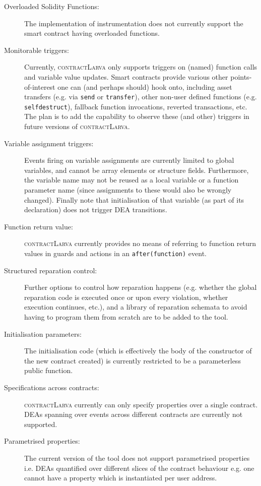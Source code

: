 \documentclass{article}
\newcommand{\contractlarva}{\textsc{contractLarva}\xspace}
\begin{document}
  \begin{description}
    \item[Overloaded Solidity Functions:] The implementation of instrumentation does not currently support the smart contract having overloaded functions.
    \item[Monitorable triggers:] Currently, \contractlarva only supports triggers on (named) function calls and variable value updates. Smart contracts provide various other points-of-interest one can (and perhaps should) hook onto, including asset transfers (e.g. via \texttt{send} or \texttt{transfer}), other non-user defined functions (e.g. \texttt{selfdestruct}), fallback function invocations, reverted transactions, etc. The plan is to add the capability to observe these (and other) triggers in future versions of \contractlarva.   
    \item[Variable assignment triggers:] Events firing on variable assignments are currently limited to global variables, and cannot be array elements or structure fields. Furthermore, the variable name may not be reused as a local variable or a function parameter name (since assignments to these would also be wrongly changed). Finally note that initialisation of that variable (as part of its declaration) does not trigger DEA transitions.
    \item[Function return value:] \contractlarva currently provides no means of referring to function return values in guards and actions in an \texttt{after(function)} event.
    \item[Structured reparation control:] Further options to control how reparation happens (e.g. whether the global reparation code is executed once or upon every violation, whether execution continues, etc.), and a library of reparation schemata to avoid having to program them from scratch are to be added to the tool. 
    \item[Initialisation parameters:] The initialisation code (which is effectively the body of the constructor of the new contract created) is currently restricted to be a parameterless public function.
    \item[Specifications across contracts:] \contractlarva currently can only specify properties over a single contract. DEAs spanning over events across different contracts are currently not supported. 
    \item[Parametrised properties:] The current version of the tool does not support parametrised properties i.e. DEAs quantified over different slices of the contract behaviour e.g. one cannot have a property which is instantiated per user address. 
  \end{description}
  
\end{document}
